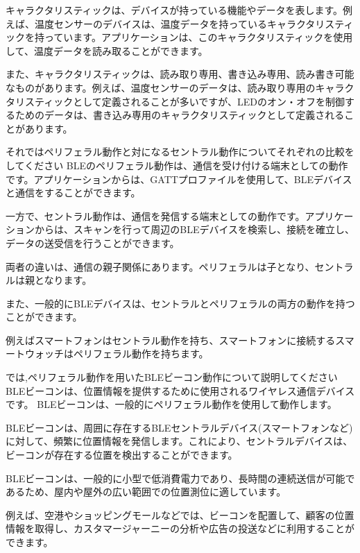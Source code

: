 キャラクタリスティックは、デバイスが持っている機能やデータを表します。例えば、温度センサーのデバイスは、温度データを持っているキャラクタリスティックを持っています。アプリケーションは、このキャラクタリスティックを使用して、温度データを読み取ることができます。

また、キャラクタリスティックは、読み取り専用、書き込み専用、読み書き可能なものがあります。例えば、温度センサーのデータは、読み取り専用のキャラクタリスティックとして定義されることが多いですが、LEDのオン・オフを制御するためのデータは、書き込み専用のキャラクタリスティックとして定義されることがあります。





それではペリフェラル動作と対になるセントラル動作についてそれぞれの比較をしてください
BLEのペリフェラル動作は、通信を受け付ける端末としての動作です。アプリケーションからは、GATTプロファイルを使用して、BLEデバイスと通信をすることができます。

一方で、セントラル動作は、通信を発信する端末としての動作です。アプリケーションからは、スキャンを行って周辺のBLEデバイスを検索し、接続を確立し、データの送受信を行うことができます。

両者の違いは、通信の親子関係にあります。ペリフェラルは子となり、セントラルは親となります。

また、一般的にBLEデバイスは、セントラルとペリフェラルの両方の動作を持つことができます。

例えばスマートフォンはセントラル動作を持ち、スマートフォンに接続するスマートウォッチはペリフェラル動作を持ちます。





では,ペリフェラル動作を用いたBLEビーコン動作について説明してください
BLEビーコンは、位置情報を提供するために使用されるワイヤレス通信デバイスです。 BLEビーコンは、一般的にペリフェラル動作を使用して動作します。

BLEビーコンは、周囲に存在するBLEセントラルデバイス(スマートフォンなど)に対して、頻繁に位置情報を発信します。これにより、セントラルデバイスは、ビーコンが存在する位置を検出することができます。

BLEビーコンは、一般的に小型で低消費電力であり、長時間の連続送信が可能であるため、屋内や屋外の広い範囲での位置測位に適しています。

例えば、空港やショッピングモールなどでは、ビーコンを配置して、顧客の位置情報を取得し、カスタマージャーニーの分析や広告の投送などに利用することができます。


